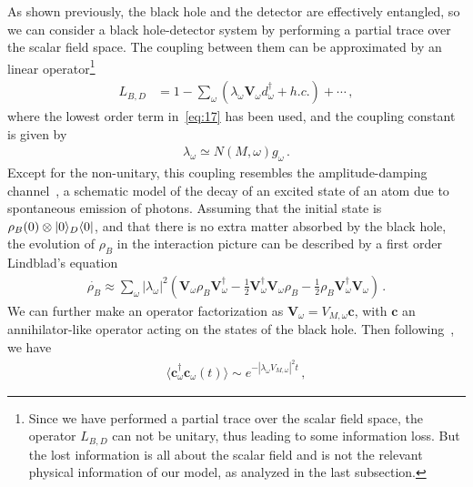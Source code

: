 \documentclass[12pt,a4paper]{article}
\begin{document}
As shown previously, the black hole and the detector are effectively entangled, so we can
consider a black hole-detector system by performing a partial trace
over the scalar field space. The coupling between them can be
approximated by an linear operator\footnote{Since we have performed
a partial trace over the scalar field space, the operator $L_{B,D}$ can not
be unitary, thus leading to some information loss. But the lost information
is all about the scalar field and is not the relevant physical
information of our model, as analyzed in the last subsection.}
\begin{equation}
\label{eq:48}
\begin{split}
L_{B,D} &=
1-\sum_{\omega}(\lambda_{\omega}\mathbf{V}_{\omega}d_{\omega}^{\dag}+h.c.)+\cdots
\,,
\end{split}
\end{equation}
where the lowest order term in~\eqref{eq:17} has been used, and
the coupling constant is given by
\begin{equation}
\label{eq:49}
\begin{split}
\lambda_{\omega}\simeq N(M,\omega)g_{\omega} \,.
\end{split}
\end{equation}
Except for the non-unitary, this coupling resembles the
amplitude-damping channel~\cite{i}, a schematic model of the decay
of an excited state of an atom due to spontaneous emission of
photons. Assuming that the initial state is
$\rho_B(0)\otimes\arrowvert0\rangle_D\langle0\arrowvert$, and that
there is no extra matter absorbed by the black hole, the
evolution of $\rho_B$ in the interaction picture can be described by
a first order Lindblad's equation~\cite{i}
\begin{equation}
\label{eq:50}
\begin{split}
\dot{\rho_B}\approx
\sum_{\omega}|\lambda_{\omega}|^2(\mathbf{V}_{\omega}\rho_B\mathbf{V}_{\omega}^{\dag}
-\frac{1}{2}\mathbf{V}_{\omega}^{\dag}\mathbf{V}_{\omega}\rho_B-\frac{1}{2}\rho_B\mathbf{V}_{\omega}^{\dag}\mathbf{V}_{\omega})
\,.
\end{split}
\end{equation}
We can further make an operator factorization as
$\mathbf{V}_{\omega}=V_{M,\omega}\mathbf{c}$, with $\mathbf{c}$ an
annihilator-like operator acting on the states of the black hole.
Then following~\cite{i}, we have
\begin{equation}
\label{eq:51}
\begin{split}
\langle\mathbf{c}_{\omega}^{\dag}\mathbf{c}_{\omega}(t)\rangle\sim
e^{-|\lambda_{\omega}V_{M,\omega}|^2t} \,,
\end{split}
\end{equation}
\end{document}
